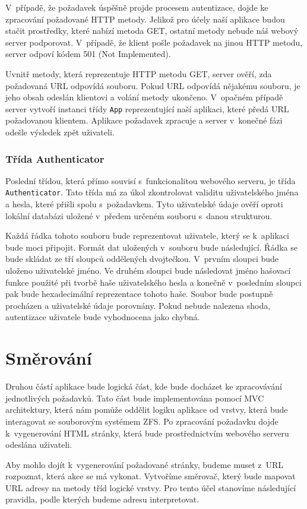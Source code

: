     V~případě, že požadavek úspěšně projde procesem autentizace, dojde ke zpracování požadované HTTP metody. Jelikož pro účely naší aplikace budou stačit prostředky, které nabízí metoda GET, ostatní metody nebude náš webový server podporovat. V~případě, že klient pošle požadavek na jinou HTTP metodu, server odpoví kódem 501 (Not Implemented).

    Uvnitř metody, která reprezentuje HTTP metodu GET, server ověří, zda požadovaná URL odpovídá souboru. Pokud URL odpovídá nějakému souboru, je jeho obsah odeslán klientovi a volání metody ukončeno. V~opačném případě server vytvoří instanci třídy \verb|App| reprezentující naší aplikaci, které předá URL požadovanou klientem. Aplikace požadavek zpracuje a server v~konečné fázi odešle výsledek zpět uživateli.
    \subsubsection{Třída Authenticator}
    Poslední třídou, která přímo souvisí s~funkcionalitou webového serveru, je třída \verb|Authenticator|. Tato třída má za úkol zkontrolovat validitu uživatelského jména a hesla, které přišli spolu s~požadavkem. Tyto uživatelské údaje ověří oproti lokální databázi uložené v~předem určeném souboru s~danou strukturou.

    Každá řádka tohoto souboru bude reprezentovat uživatele, který se k~aplikaci bude moci připojit. Formát dat uložených v~souboru bude následující. Řádka se bude skládat ze tří sloupců oddělených dvojtečkou. V~prvním sloupci bude uloženo uživatelské jméno. Ve druhém sloupci bude následovat jméno hašovací funkce použité při tvorbě haše uživatelského hesla a konečně v~posledním sloupci pak bude hexadecimální reprezentace tohoto haše. Soubor bude postupně procházen a uživatelské údaje porovnány. Pokud nebude nalezena shoda, autentizace uživatele bude vyhodnocena jako chybná.
\section{Směrování}
\label{route}
Druhou částí aplikace bude logická část, kde bude docházet ke zpracovávání jednotlivých požadavků. Tato část bude implementována pomocí MVC architektury, která nám pomůže oddělit logiku aplikace od vrstvy, která bude interagovat se souborovým systémem ZFS. Po zpracování požadavku dojde k~vygenerování HTML stránky, která bude prostřednictvím webového serveru odeslána uživateli.

Aby mohlo dojít k~vygenerování požadované stránky, budeme muset z~URL rozpoznat, která akce se má vykonat. Vytvoříme směrovač, který bude mapovat URL adresy na metody tříd logické vrstvy. Pro tento účel stanovíme následující pravidla, podle kterých budeme adresu interpretovat.

